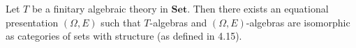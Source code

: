 Let $T$ be a finitary algebraic theory in $\mathbf{Set}$. Then there exists an equational presentation $(\Omega, E)$ such that $T$-algebras and $(\Omega, E)$-algebras are isomorphic as categories of sets with structure (as defined in 4.15).
